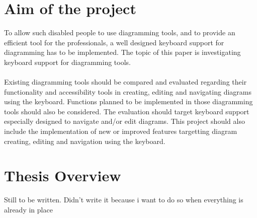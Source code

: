 \section{Aim of the project}
To allow such disabled people to use diagramming tools, and to provide an efficient tool for the professionals, a well designed keyboard support for diagramming has to be implemented.
The topic of this paper is investigating keyboard support for diagramming tools.

\paragraph{}
Existing diagramming tools should be compared and evaluated regarding their functionality and accessibility tools in creating, editing and navigating diagrams using the keyboard. Functions planned to be implemented in those diagramming tools should also be considered. The evaluation should target keyboard support especially designed to navigate and/or edit diagrams.
This project should also include the implementation of new or improved features targetting diagram creating, editing and navigation using the keyboard.

\section{Thesis Overview}
Still to be written. Didn't write it because i want to do so when everything is already in place


